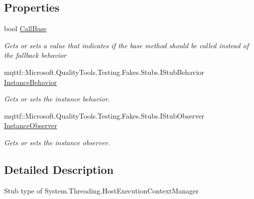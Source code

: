 \subsection*{Properties}
\begin{DoxyCompactItemize}
\item 
bool \hyperlink{class_system_1_1_threading_1_1_fakes_1_1_stub_host_execution_context_manager_a4c735ff15aeadfd3ba0be714b744abca}{Call\-Base}
\begin{DoxyCompactList}\small\item\em Gets or sets a value that indicates if the base method should be called instead of the fallback behavior\end{DoxyCompactList}\item 
mqttf\-::\-Microsoft.\-Quality\-Tools.\-Testing.\-Fakes.\-Stubs.\-I\-Stub\-Behavior \hyperlink{class_system_1_1_threading_1_1_fakes_1_1_stub_host_execution_context_manager_a55e79aa4159513deae52b116288e81c5}{Instance\-Behavior}
\begin{DoxyCompactList}\small\item\em Gets or sets the instance behavior.\end{DoxyCompactList}\item 
mqttf\-::\-Microsoft.\-Quality\-Tools.\-Testing.\-Fakes.\-Stubs.\-I\-Stub\-Observer \hyperlink{class_system_1_1_threading_1_1_fakes_1_1_stub_host_execution_context_manager_a1cae8b32a395c01683c3d8a57f1ced62}{Instance\-Observer}
\begin{DoxyCompactList}\small\item\em Gets or sets the instance observer.\end{DoxyCompactList}\end{DoxyCompactItemize}


\subsection{Detailed Description}
Stub type of System.\-Threading.\-Host\-Execution\-Context\-Manager



